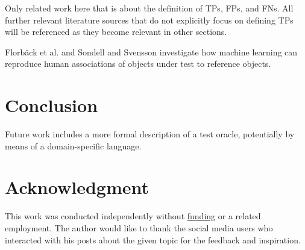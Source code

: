 \documentclass[conference]{IEEEtran}
\begin{document}
Only related work here that is about the definition of TPs, FPs, and FNs. 
All further relevant literature sources that do not explicitly focus on defining TPs will be referenced as they become relevant in other sections. 

Florbäck et al. \cite{Florbaeck2016.matching.offline} and Sondell and Svensson \cite{Sondell2018} investigate how machine learning can reproduce human associations of objects under test to reference objects.


\section{Conclusion}
\label{sec:conclusion}

Future work includes a more formal description of a test oracle, potentially by means of a domain-specific language.

\section*{Acknowledgment}
\label{sec:acknowledgment}

This work was conducted independently without \href{https://ko-fi.com/michaelhoss}{funding} or a related employment. 
The author would like to thank the social media users who interacted with his posts about the given topic for the feedback and inspiration.

%
% 
% 
% 
% 
% 


{\small


}
\end{document}

